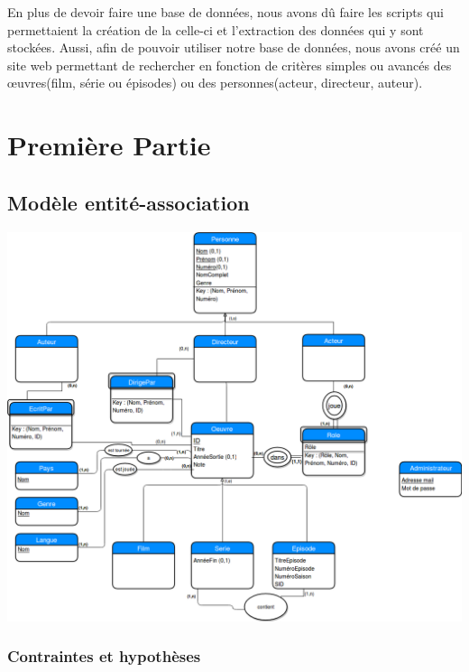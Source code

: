 \documentclass[10pt,a4paper]{article}
\begin{document}
En plus de devoir faire une base de données, nous avons dû faire les scripts qui permettaient la création de la celle-ci et l'extraction des données qui y sont stockées. Aussi, afin de pouvoir utiliser notre base de données, nous avons créé un site web permettant de rechercher en fonction de critères simples ou avancés des œuvres(film, série ou épisodes) ou des personnes(acteur, directeur, auteur).

\newpage
\section{Première Partie}\label{première partie}

\subsection{Modèle entité-association}

\includegraphics[width = 17cm]{Diag_E-A}

\subsubsection{Contraintes et hypothèses}
\end{document}
